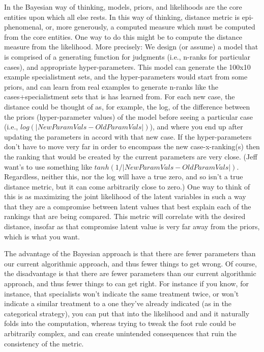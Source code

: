 \documentclass{article}
\begin{document}
In the Bayesian way of thinking, models, priors, and likelihoods are the core entities upon which all else rests. In this way of thinking, distance metric is epi-phenomenal, or, more generously, a computed measure which must be computed from the core entities. One way to do this might be to compute the distance measure from the likelihood. More precisely: We design (or assume) a model that is comprised of a generating function for judgments (i.e., n-ranks for particular cases), and appropriate hyper-parameters. This model can generate the 100x10 example specialistment sets, and the hyper-parameters would start from some priors, and can learn from real examples to generate n-ranks like the cases+specialistment sets that is has learned from. For each new case, the distance could be thought of as, for example, the log, of the difference between the priors (hyper-parameter values) of the model before seeing a particular case (i.e., $log(|NewParamVals-OldParamVals|)$), and where you end up after updating the parameters in accord with that new case. If the hyper-parameters don't have to move very far in order to encompass the new case-x-ranking(s) then the ranking that would be created by the current parameters are very close. (Jeff want's to use something like $tanh(1/|NewParamVals-OldParamVals|)$. Regardless, neither this, nor the log will have a true zero, and so isn't a true distance metric, but it can come arbitrarily close to zero.) One way to think of this is as maximizing the joint likelihood of the latent variables in such a way that they are a compromise between latent values that best explain each of the rankings that are being compared. This metric will correlate with the desired distance, insofar as that compromise latent value is very far away from the priors, which is what you want. 

The advantage of the Bayesian approach is that there are fewer parameters than our current algorithmic approach, and thus fewer things to get wrong. Of course, the disadvantage is that there are fewer parameters than our current algorithmic approach, and thus fewer things to can get right. For instance if you know, for instance, that specialists won't indicate the same treatment twice, or won't indicate a similar treatment to a one they've already indicated (as in the categorical strategy), you can put that into the likelihood and and it naturally folds into the computation, whereas trying to tweak the foot rule could be arbitrarily complex, and can create unintended consequences that ruin the consistency of the metric.
\end{document}
